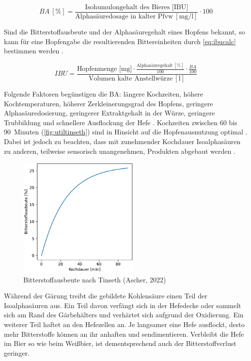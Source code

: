 \documentclass[a4paper,parskip=half]{scrartcl}
\newcommand{\BA}{\mathit{BA}}
\newcommand{\IBU}{\mathit{IBU}}
\newcommand{\uper}{\:[\text{\%}]}
\newcommand{\uli}{\:[\text{l}]}
\newcommand{\ucon}{\:[\text{mg/l}]}
\begin{document}
\begin{equation}
\BA \uper = \frac{\text{Isohumulongehalt des Bieres [IBU]}}{\text{Alphasäuredosage in kalter Pfvw} \ucon} \cdot 100
\label{eq:badef}
\end{equation}

Sind die Bitterstoffausbeute und der Alphasäuregehalt eines Hopfens bekannt, so kann für eine Hopfengabe die resultierenden Bittereinheiten durch \autoref{eq:ibucalc} bestimmen werden \parencite{Thesseling2019}.

\begin{equation}
\IBU = \frac{\text{Hopfenmenge [mg]} \cdot \frac{\text{Alphasäuregehalt} \uper}{100} \cdot \frac{\BA}{100}}{\text{Volumen kalte Anstellwürze} \uli}
\label{eq:ibucalc}
\end{equation}

Folgende Faktoren begünstigen die BA: längere Kochzeiten,
höhere Kochtemperaturen, höherer Zerkleinerungsgrad des Hopfens, geringere Alphasäuredosierung, geringerer Extraktgehalt in der Würze, geringere Trubbildung und schnellere Ausflockung der Hefe \parencite{Hosom2017}. Kochzeiten zwischen 60 bis 90~Minuten (\autoref{fig:utiltinseth}) sind in Hinsicht auf die Hopfenausnutzung optimal \parencite[5]{Malowicki2005}. Dabei ist jedoch zu beachten, dass mit zunehmender Kochdauer Isoalphasäuren zu anderen, teilweise sensorisch unangenehmen, Produkten abgebaut werden \parencite{Kappler2010}.

\begin{figure}[H]
\centering
\includegraphics[width=6cm]{graph_tinseth.pdf}
\caption{Bitterstoffausbeute nach Tinseth (Ascher, 2022)}
\label{fig:utiltinseth}
\end{figure}

Während der Gärung treibt die gebildete Kohlensäure einen Teil der Isoalphasäuren aus. Ein Teil davon verfängt sich in der Hefedecke oder sammelt sich am Rand des Gärbehälters und verhärtet sich aufgrund der Oxidierung. Ein weiterer Teil haftet an den Hefezellen an. Je langsamer eine Hefe ausflockt, desto mehr Bitterstoffe können an ihr anhaften und sendimentieren. Verbleibt die Hefe im Bier so wie beim Weißbier, ist dementsprechend auch der Bitterstoffverlust geringer. \parencite[126]{Garetz1994} 
\end{document}
